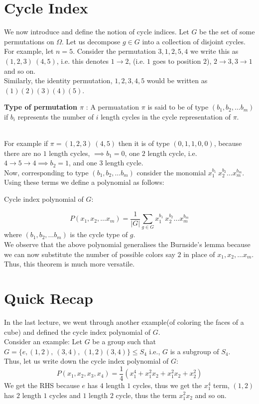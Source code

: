{\section{Cycle Index}
We now introduce and define the notion of cycle indices. Let $G$ be the set of some permutations on $\Omega$. Let us decompose $g \in G$ into a collection of disjoint cycles. 
\\
For example, let $n = 5$. Consider the permutation $3, 1, 2, 5, 4$ we write this as $(1, 2, 3)\ (4, 5)$, i.e. this denotes $1 \rightarrow 2$, (i.e. $1$ goes to position $2$), $2 \rightarrow 3, 3 \rightarrow 1$ and so on. 
\\
Similarly, the identity permutation, $1, 2, 3, 4, 5$ would be written as $(1)(2)(3)(4)(5)$.
\begin{definition}
\textbf{Type of permutation $\pi$} : A permuatation $\pi$ is said to be of type $(b_1, b_2, \ldots b_m)$ if $b_i$ represents the number of $i$ length cycles in the cycle representation of $\pi$.
\end{definition}
\\
For example if $\pi = (1, 2, 3)\ (4, 5)$ then it is of type $(0, 1, 1, 0, 0)$, because there are no $1$ length cycles, $\implies b_1 = 0$, one $2$ length cycle, i.e. $4 \rightarrow 5 \rightarrow 4 \implies b_2 = 1$, and one $3$ length cycle.
\\
Now, corresponding to type $(b_1, b_2, \ldots b_m)$ consider the monomial $x_1^{b_1}\ x_2^{b_2} \ldots x_m^{b_m}$. Using these terms we define a polynomial as follows:
\begin{definition}
Cycle index polynomial of $G$:
\end{definition}
$$P(x_1, x_2, \ldots x_m) = \frac{1}{|G|} \sum_{g \in G} x_1^{b_1}\ x_2^{b_2} \ldots x_m^{b_m}$$ where $(b_1, b_2, \ldots b_m)$ is the cycle type of $g$.
\\
We observe that the above polynomial generalises the Burnside's lemma because we can now substitute the number of possible colors say $2$ in place of $x_1, x_2, \ldots x_m$. Thus, this theorem is much more versatile.
\\

\section{Quick Recap}
In the last lecture, we went through another example(of coloring the faces of a cube) and defined the cycle index polynomial of $G$.
\\
Consider an example:
Let $G$ be a group such that $G = \{e, (1, 2),\ (3, 4),\ (1,2)(3,4)\} \le S_4$
i.e., $G$ is a subgroup of $S_4$.
\\
Thus, let us write down the cycle index polynomial of $G$:
$$P(x_1, x_2, x_3, x_4) = \frac{1}{4} (x_1^4 + x_1^2x_2 + x_1^2x_2 + x_2^2)$$
We get the RHS because $e$ has $4$ length $1$ cycles, thus we get the $x_1^4$ term, $(1, 2)$ has $2$ length $1$ cycles and $1$ length $2$ cycle, thus the term $x_1^2x_2$ and so on.

}
